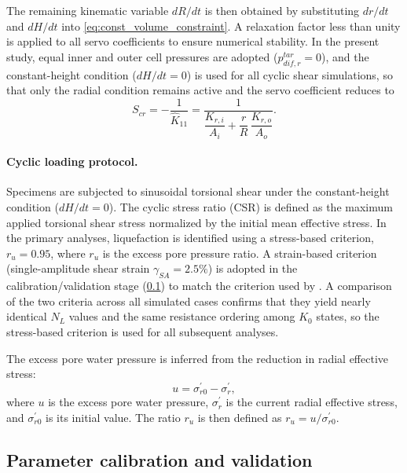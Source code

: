\documentclass[a4paper,fleqn]{cas-sc}
\newcommand{\Kzero}{\ensuremath{K_0}}
\newcommand{\ru}{\ensuremath{r_u}}
\begin{document}
The remaining kinematic variable $dR/dt$ is then obtained by substituting $dr/dt$ and $dH/dt$ into \cref{eq:const_volume_constraint}. A relaxation factor less than unity is applied to all servo coefficients to ensure numerical stability. In the present study, equal inner and outer cell pressures are adopted ($p_{dif,r}^{tar}=0$), and the constant-height condition ($dH/dt=0$) is used for all cyclic shear simulations, so that only the radial condition remains active and the servo coefficient reduces to
\begin{equation}
S_{cr} = -\frac{1}{\hat{K}_{11}} = \frac{1}{\dfrac{K_{r,i}}{A_i}+\dfrac{r}{R}\,\dfrac{K_{r,o}}{A_o}}.
\label{eq:Scr_constantH_main}
\end{equation}

\paragraph{Cyclic loading protocol.}
Specimens are subjected to sinusoidal torsional shear under the constant-height condition ($dH/dt=0$). The cyclic stress ratio (CSR) is defined as the maximum applied torsional shear stress normalized by the initial mean effective stress. In the primary analyses, liquefaction is identified using a stress-based criterion, $\ru = 0.95$, where $\ru$ is the excess pore pressure ratio. A strain-based criterion (single-amplitude shear strain $\gamma_{SA}=2.5\%$) is adopted in the calibration/validation stage (\cref{subsec:calibration_validation}) to match the criterion used by \citet{Ishihara1985}. A comparison of the two criteria across all simulated cases confirms that they yield nearly identical $N_L$ values and the same resistance ordering among \Kzero{} states, so the stress-based criterion is used for all subsequent analyses.

The excess pore water pressure is inferred from the reduction in radial effective stress:
\begin{equation}
u = \sigma_{r0}^{\prime} - \sigma_r^{\prime},
\label{eq:epwp_definition}
\end{equation}
where $u$ is the excess pore water pressure, $\sigma_r^{\prime}$ is the current radial effective stress, and $\sigma_{r0}^{\prime}$ is its initial value. The ratio $\ru$ is then defined as $\ru = u/\sigma_{r0}^{\prime}$.

\subsection{Parameter calibration and validation}
\label{subsec:calibration_validation}
\end{document}
